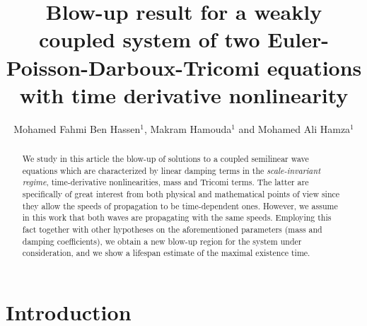 \documentclass[12pt,leqno]{amsart}
\date{}
\numberwithin{equation}{section}
\theoremstyle{remark}
\begin{document}
\title[Blow-up result for a weakly coupled system of wave  equations]{Blow-up result for a weakly coupled system of 
two Euler-Poisson-Darboux-Tricomi equations with time derivative nonlinearity}
\author[M.F. Ben Hassen, M. Hamouda and M. A. Hamza]{Mohamed Fahmi Ben Hassen$^{1}$, Makram Hamouda$^{1}$ and Mohamed Ali Hamza$^{1}$}
\address{$^{1}$  Department of Basic Sciences, Deanship of Preparatory Year and Supporting Studies, Imam Abdulrahman Bin Faisal University, P. O. Box 1982, Dammam, Saudi Arabia.}



\medskip





\pagestyle{plain}


\maketitle


\begin{abstract}
We study in this article   the blow-up of solutions to a coupled semilinear wave equations which are characterized by  linear damping terms in the \textit{scale-invariant regime}, time-derivative nonlinearities, mass  and Tricomi terms. The latter are specifically of great interest from both physical and mathematical points of view since they allow the  speeds of propagation to be time-dependent ones. However, we assume in this work that both waves are propagating with the same speeds.  Employing this fact together with other hypotheses on the aforementioned parameters (mass and damping coefficients), we obtain a new blow-up region for the system under consideration, and we show a lifespan estimate of the maximal existence time.
\end{abstract}


\section{Introduction}
\par\quad
\end{document}
